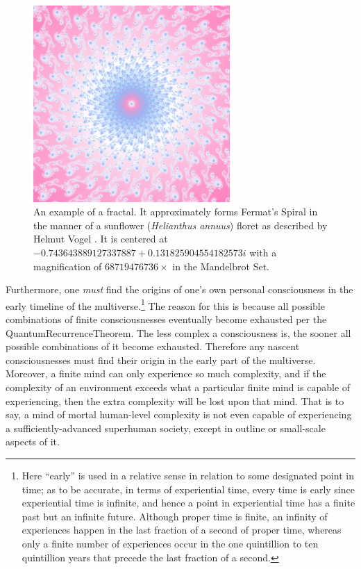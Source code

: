 \documentclass[letterpaper,12pt]{article}
\begin{document}
\begin{figure}[htbp]
  \centering
    \includegraphics[width=0.66666667\textwidth]{FermatSpiral1.jpg}
  \caption[An Example of a Fractal]{An example of a fractal. It approximately forms Fermat's Spiral in the manner of a sunflower (\emph{Helianthus annuus}) floret as described by Helmut Vogel \cite{Vogel1979}. It is centered at \( -0.743643889127337887 + 0.131825904554182573 i \) with a magnification of \( 68719476736 \times \) in the Mandelbrot Set.}
  \label{fig:FermatSpiral1.jpg}
\end{figure}

Furthermore, one \emph{must} find the origins of one's own personal consciousness in the early timeline of the multiverse.\footnote{Here ``early'' is used in a relative sense in relation to some designated point in time; as to be accurate, in terms of experiential time, every time is early since experiential time is infinite, and hence a point in experiential time has a finite past but an infinite future. Although proper time is finite, an infinity of experiences happen in the last fraction of a second of proper time, whereas only a finite number of experiences occur in the one quintillion to ten quintillion years that precede the last fraction of a second.} The reason for this is because all possible combinations of finite consciousnesses eventually become exhausted per the \gls{QuantumRecurrenceTheorem}. The less complex a consciousness is, the sooner all possible combinations of it become exhausted. Therefore any nascent consciousnesses must find their origin in the early part of the multiverse. Moreover, a finite mind can only experience so much complexity, and if the complexity of an environment exceeds what a particular finite mind is capable of experiencing, then the extra complexity will be lost upon that mind. That is to say, a mind of mortal human-level complexity is not even capable of experiencing a sufficiently-advanced superhuman society, except in outline or small-scale aspects of it.
\end{document}

